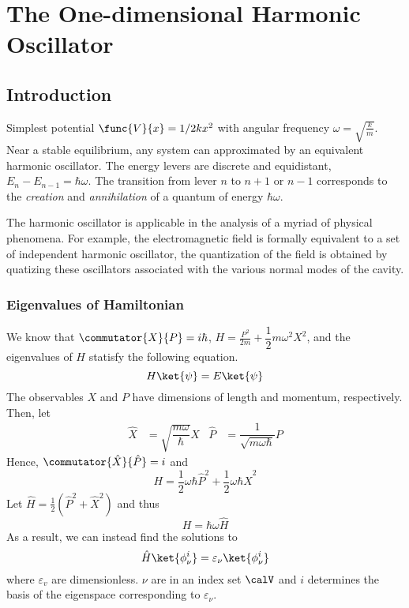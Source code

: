 
\chapter{The One-dimensional Harmonic Oscillator}
\section{Introduction}
Simplest potential \(\func{V}{x} = 1/2 kx^2\) with angular frequency \(\omega = \sqrt{\frac{k}{m}}\). Near a stable equilibrium, any system can approximated by an equivalent harmonic oscillator. The energy levers are discrete and equidistant, \(E_n - E_{n - 1} = \hbar \omega\). The transition from lever \(n\) to \(n + 1\) or \(n - 1\) corresponds to the \textit{creation} and \textit{annihilation} of a quantum of energy \(\hbar \omega\).

The harmonic oscillator is applicable in the analysis of a myriad of physical phenomena. For example, the electromagnetic field is formally equivalent to a set of independent harmonic oscillator, the quantization of the field is obtained by quatizing these oscillators associated with the various normal modes of the cavity.  
\subsection{Eigenvalues of Hamiltonian}
We know that \(\commutator{X}{P} = i\hbar\), \(H = \frac{P^2}{2m} + \dfrac{1}{2}m \omega^2 X^2 \), and the eigenvalues of \(H\) statisfy the following equation.
\begin{equation*}
    H \ket{\psi} = E \ket{\psi}
\end{equation*}
The observables \(X\) and \(P\) have dimensions of length and momentum, respectively. Then, let
\begin{align*}
    \hat{X} &= \sqrt{\dfrac{m\omega}{\hbar}} X &\hat{P} &= \dfrac{1}{\sqrt{m\omega \hbar}} P
\end{align*}
Hence, \(\commutator{\hat{X}}{\hat{P}} = i\) and
\begin{equation*}
    H = \frac{1}{2} \omega \hbar \hat{P}^2 + \dfrac{1}{2}\omega \hbar \hat{X}^2
\end{equation*}
Let \(\hat{H} = \frac{1}{2} (\hat{P}^2 + \hat{X}^2)\) and thus
\begin{equation*}
    H = \hbar \omega \hat{H}
\end{equation*}
As a result, we can instead find the solutions to
\begin{equation*}
    \hat{H} \ket{\phi_{\nu}^i} = \varepsilon_{\nu} \ket{\phi_{\nu}^i}
\end{equation*}
where \(\varepsilon_v\) are dimensionless. \(\nu\) are in an index set \(\calV\) and \(i\) determines the basis of the eigenspace corresponding to \(\varepsilon_{\nu}\).

